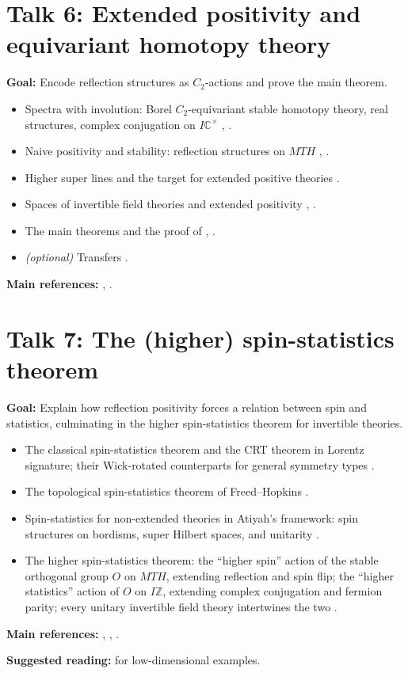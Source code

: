 \documentclass[11pt,a4paper]{article}
\newcommand{\MT}{\mathit{MT}}
\newcommand{\IZ}{I\mathbb{Z}}
\newcommand{\talk}[2]{\section*{Talk #1: #2}}
\newcommand{\refs}[1]{\par\smallskip\textbf{Main references:} #1}
\newcommand{\suggested}[1]{\par\textbf{Suggested reading:} #1}
\begin{document}
\talk{6}{Extended positivity and equivariant homotopy theory}

\textbf{Goal:} Encode reflection structures as $C_2$-actions and prove the main theorem.

\begin{itemize}
  \item Spectra with involution: Borel $C_2$-equivariant stable homotopy theory, real structures, complex conjugation on $I\mathbb{C}^\times$ \cite[L8.2--L8.3]{F}, \cite[\S\S6.1--6.3]{FH}.
  \item Naive positivity and stability: reflection structures on $\MT H$ \cite[L8.1]{F}, \cite[\S7.2]{FH}.
  \item Higher super lines and the target for extended positive theories \cite[L8.4]{F}.
  \item Spaces of invertible field theories and extended positivity \cite[L8.5]{F}, \cite[\S8.1]{FH}.
  \item The main theorems and the proof of \cite[Theorem~8.20]{FH} \cite[L8.6]{F}, \cite[\S8.2]{FH}.
  \item \emph{(optional)} Transfers \cite[\S8.3]{FH}.
\end{itemize}
\refs{\cite[L8]{F}, \cite[\S\S6--8]{FH}.}

\talk{7}{The (higher) spin-statistics theorem}

\textbf{Goal:} Explain how reflection positivity forces a relation between spin and statistics, culminating in the higher spin-statistics theorem for invertible theories.

\begin{itemize}
  \item The classical spin-statistics theorem and the CRT theorem in Lorentz signature; their Wick-rotated counterparts for general symmetry types \cite[Appendix~A]{FH}.
  \item The topological spin-statistics theorem of Freed--Hopkins \cite[\S11]{FH}.
  \item Spin-statistics for non-extended theories in Atiyah's framework: spin structures on bordisms, super Hilbert spaces, and unitarity \cite{S}.
  \item The higher spin-statistics theorem: the ``higher spin'' action of the stable orthogonal group $O$ on $\MT H$, extending reflection and spin flip; the ``higher statistics'' action of $O$ on $\IZ$, extending complex conjugation and fermion parity; every unitary invertible field theory intertwines the two \cite{KMS}.
\end{itemize}
\refs{\cite[\S11, Appendix~A]{FH}, \cite{KMS}, \cite{S}.}
\suggested{\cite{MS} for low-dimensional examples.}
\end{document}
